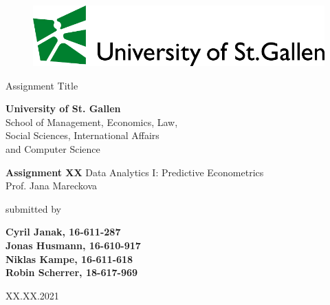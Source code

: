 \begin{center}
\begin{figure}[htb]
  \centering
  \def\svgwidth{450pt}
  \scriptsize{\includegraphics[width=15cm]{res/logo-hsg-neu-en.pdf}}
\end{figure}
\end{center}

\medskip
\begin{center}
  \huge{Assignment Title}
\end{center}

\medskip
\begin{center}
  \normalsize{\textbf{University of St. Gallen}\\
              School of Management, Economics, Law,\\
              Social Sciences, International Affairs \\
              and Computer Science}
\end{center}

\medskip
\begin{center}
\textbf{\Large{Assignment XX}}
\linebreak
\linebreak
\normalsize{Data Analytics I: Predictive Econometrics\\
            Prof. Jana Mareckova}
\end{center}
\medskip
\begin{center}
  submitted by
\end{center}
\medskip
\begin{center}
  \Large{\textbf{Cyril Janak, 16-611-287}}\\
  \Large{\textbf{Jonas Husmann, 16-610-917}}\\
  \Large{\textbf{Niklas Kampe, 16-611-618}}\\
  \Large{\textbf{Robin Scherrer, 18-617-969}}
\end{center}

\vspace*{\fill}
\begin{center}
\large{XX.XX.2021}
\end{center}